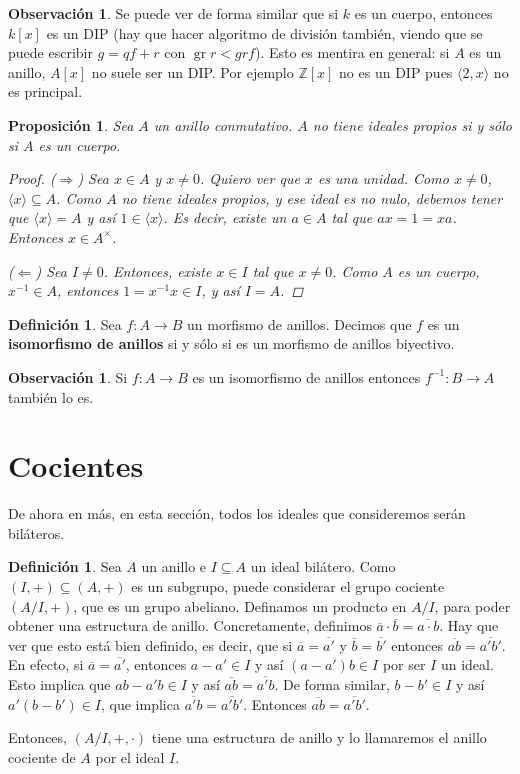 \documentclass[12pt]{book}
\newtheorem{prop}[teo]{Proposición}
\theoremstyle{definition}
\newtheorem{obs}[teo]{Observación}
\newtheorem{defn}[teo]{Definición}
\newcommand{\ZZ}{\mathbb{Z}}      %
\DeclareMathOperator{\gr}{gr}
\begin{document}
\begin{obs}
Se puede ver de forma similar que si $k$ es un cuerpo, entonces $k[x]$ es un DIP (hay que hacer algoritmo de división también, viendo que se puede escribir $g= qf + r$ con $\gr r < gr f$). Esto es mentira en general: si $A$ es un anillo, $A[x]$ no suele ser un DIP. Por ejemplo $\ZZ[x]$ no es un DIP pues $\langle 2,x\rangle$ no es principal.
\end{obs}

\begin{prop}
Sea $A$ un anillo conmutativo. $A$ no tiene ideales propios si y sólo si $A$ es un cuerpo.
\begin{proof}
($\Longrightarrow$) Sea $x\in A$ y $x\neq 0$. Quiero ver que $x$ es una unidad. Como $x\neq 0$, $\langle x\rangle \subseteq A$. Como $A$ no tiene ideales propios, y ese ideal es no nulo, debemos tener que $\langle x \rangle = A$ y así $1\in \langle x\rangle $. Es decir, existe un $a\in A$ tal que $ax=1=xa$. Entonces $x\in A^\times$.

($\Longleftarrow$) Sea $I\neq 0$. Entonces, existe $x\in I$ tal que $x\neq 0$. Como $A$ es un cuerpo, $x^{-1}\in A$, entonces $1=x^{-1}x \in I$, y así $I=A$. 
\end{proof}
\end{prop}

\begin{defn}
Sea $f:A\to B$ un morfismo de anillos. Decimos que $f$ es un \textbf{isomorfismo de anillos} si y sólo si es un morfismo de anillos biyectivo.
\end{defn}

\begin{obs}
Si $f:A\to B$ es un isomorfismo de anillos entonces $f^{-1}:B\to A$ también lo es.
\end{obs}

\section{Cocientes}

De ahora en más, en esta sección, todos los ideales que consideremos serán biláteros.

\begin{defn}
Sea $A$ un anillo e $I\subseteq A$ un ideal bilátero. Como $(I,+)\subseteq (A,+)$ es un subgrupo, puede considerar el grupo cociente $(A/I,+)$, que es un grupo abeliano.
Definamos un producto en $A/I$, para poder obtener una estructura de anillo. Concretamente, definimos $\overline{a}\cdot\overline{b} = \overline{a\cdot b}$. Hay que ver que esto está bien definido, es decir, que si $\overline{a}=\overline{a'}$ y $\overline{b}=\overline{b'}$ entonces $\overline{ab} = \overline{a'b'}$. En efecto, si $\overline{a}=\overline{a'}$, entonces $a-a'\in I$ y así $(a-a')b\in I$ por ser $I$ un ideal. Esto implica que $ab-a'b\in I$ y así $\overline{ab}=\overline{a'b}$. De forma similar, $b-b'\in I$ y así $a'(b-b')\in I$, que implica $\overline{a'b} = \overline{a'b'}$. Entonces $\overline{ab}=\overline{a'b'}$.

Entonces, $(A/I,+,\cdot)$ tiene una estructura de anillo y lo llamaremos el anillo cociente de $A$ por el ideal $I$.

\end{defn}
\end{document}
